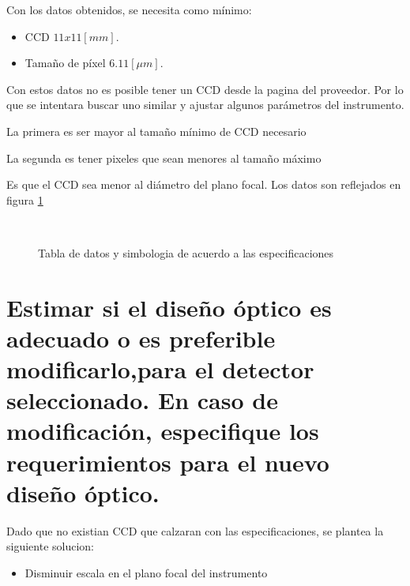 \documentclass[a4paper,10pt]{article}
\begin{document}
Con los datos obtenidos, se necesita como mínimo:
\begin{itemize}
\item CCD $11x11[mm]$.
\item Tamaño de píxel $6.11 [\mu m]$.
\end{itemize}

Con estos datos no es posible tener un CCD desde la pagina del proveedor. Por
lo que se intentara buscar uno similar y ajustar algunos parámetros del
instrumento.

La primera es ser mayor al tamaño mínimo de CCD necesario

La segunda es tener pixeles que sean menores al tamaño máximo

Es que el CCD sea menor al diámetro del plano focal. Los datos son reflejados
en figura \ref{fig:p1} 
\begin{figure}[ht!]
  \centering
  ~ 
  ~ 
  \caption{Tabla de datos y simbologia de acuerdo a las especificaciones}
  \label{fig:p1}
\end{figure}



\section{Estimar si el diseño óptico es adecuado o es preferible
modificarlo,para el detector seleccionado. En caso de modificación, especifique
los requerimientos para el nuevo diseño óptico.} Dado que no existian CCD que
calzaran con las especificaciones, se plantea la siguiente solucion:
\begin{itemize}
\item Disminuir escala en el plano focal del instrumento
\end{itemize}
\end{document}

